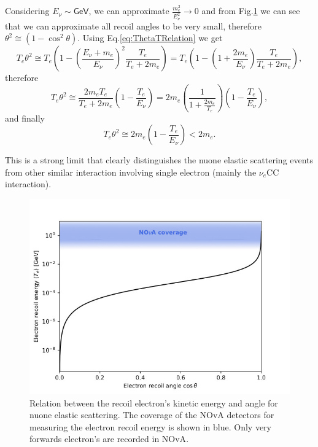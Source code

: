 Considering $E_{\nu}\sim\textsf{GeV}$, we can approximate $\frac{m_e^2}{E_{\nu}^2}\rightarrow 0$ and from Fig.\ref{fig:TThetaDistribution} we can see that we can approximate all recoil angles to be very small, therefore $\theta^2\cong \left(1-\cos^2\theta\right)$. Using Eq.\ref{eq:ThetaTRelation} we get
\begin{equation}
T_e\theta^2\cong T_e\left(1-\left(\frac{E_\nu+m_e}{E_\nu}\right)^2\frac{T_e}{T_e+2m_e}\right)
=T_e\left(1-\left(1+\frac{2m_e}{E_\nu}\right)\frac{T_e}{T_e+2m_e}\right),
\end{equation}
therefore
\begin{equation}
T_e\theta^2\cong \frac{2m_eT_e}{T_e+2m_e}\left(1-\frac{T_e}{E_\nu}\right)=2m_e\left(\frac{1}{1+\frac{2m_e}{T_e}}\right)\left(1-\frac{T_e}{E_\nu}\right),
\end{equation}
and finally
\begin{equation}\label{eqTThetaSqExp}
T_e\theta^2\cong 2m_e\left(1-\frac{T_e}{E_{\nu}}\right)<2m_e.
\end{equation}

This is a strong limit that clearly distinguishes the \gls{nuone} elastic scattering events from other similar interaction involving single electron (mainly the $\nu_e$\gls{CC} interaction).

\begin{figure}[hbtp]
\centering
\includegraphics[width=.7\linewidth]{Plots/NuMM/KinematicsTOnTh.jpeg}
\caption[Electron recoil energy versus recoil angle]{Relation between the recoil electron's kinetic energy and angle for \acrshort{nuone} elastic scattering. The coverage of the \acrshort{NOvA} detectors for measuring the electron recoil energy is shown in blue. Only very forwards electron's are recorded in \acrshort{NOvA}.}
\label{fig:TThetaDistribution}
\end{figure}

